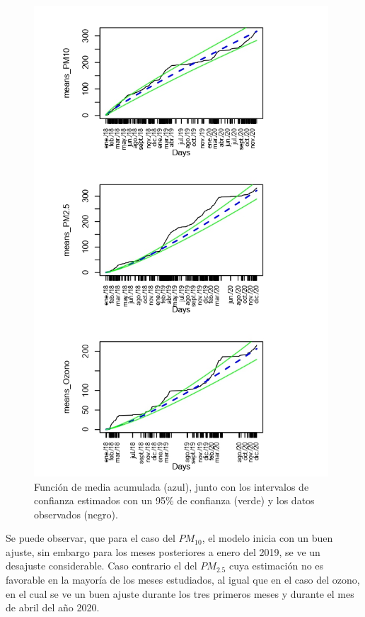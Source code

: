 \begin{figure}[h!]
\begin{center}
\includegraphics[width=11cm]{MEANSSPC}
\end{center}
\centering
\caption{ Función de media acumulada (azul), junto con los intervalos de confianza estimados con un 95\% de confianza (verde) y los datos observados (negro).  }
\label{mediasacumcomp}
\end{figure}



Se puede observar, que para el caso del $PM_{10}$, el modelo inicia con un buen ajuste, sin embargo para los meses posteriores a enero del 2019, se ve un desajuste considerable. Caso contrario el del $PM_{2.5}$ cuya estimación no es favorable en la mayoría de los meses estudiados, al igual que en el caso del ozono, en el cual se ve un buen ajuste durante los tres primeros meses y durante el mes de abril del año 2020. 



